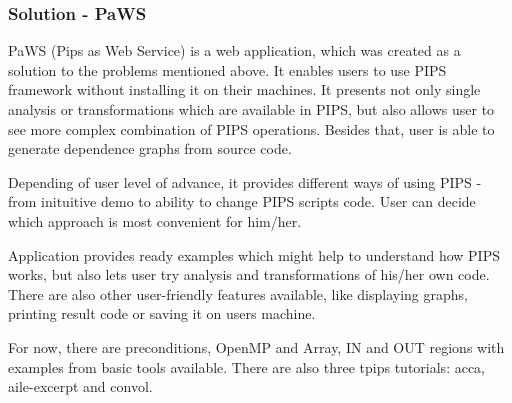 \subsubsection{Solution - PaWS}

PaWS (Pips as Web Service) is a web application, which was created as a solution to the problems mentioned above. It enables users to use PIPS framework without installing it on their machines. It presents not only single analysis or transformations which are available in PIPS, but also allows user to see more complex combination of PIPS operations. Besides that, user is able to generate dependence graphs from source code.

Depending of user level of advance, it provides different ways of using PIPS - from inituitive demo to ability to change PIPS scripts code. User can decide which approach is most convenient for him/her.

Application provides ready examples which might help to understand how PIPS works, but also lets user try analysis and transformations of his/her own code. There are also other user-friendly features available, like displaying graphs, printing result code or saving it on users machine.

For now, there are preconditions, OpenMP and Array, IN and OUT regions with examples from basic tools available. There are also three tpips tutorials: acca, aile-excerpt and convol.